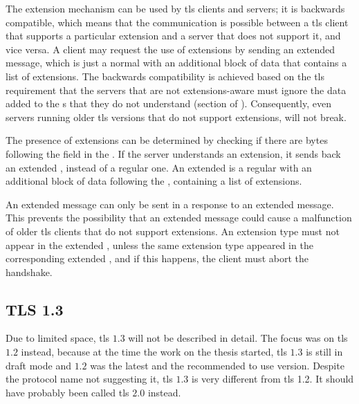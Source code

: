 \documentclass{llncs}
\begin{document}
The extension mechanism can be used by \gls{tls} clients and servers; it is backwards
compatible, which means that the communication is possible between a \gls{tls} client that supports a particular extension and a server that does not support it,
and vice versa. A client may request the use of extensions by sending an extended 
message, which is just a normal  with an additional
block of data that contains a list of extensions. The backwards compatibility is achieved based on the \gls{tls}
requirement that the servers that are not extensions-aware must ignore the data
added to the s that they do not understand (section  of \cite{RFC2246}). Consequently,
even servers running older \gls{tls} versions that do not support extensions, will not break.

The presence of extensions can be determined by checking if there are bytes
following the  field in the .
If the server understands an extension, it sends back an extended ,
instead of a regular one. An extended  is a regular
 with an additional block of data following the
, containing a list of extensions.

An extended  message can only be sent in a response to an
extended  message. This prevents the possibility that an extended
 message could cause a malfunction of older \gls{tls} clients that do not
support extensions. An extension type must not appear in the
extended , unless the same extension type appeared in the
corresponding extended , and if this happens, the client must abort the handshake.

\subsection{TLS 1.3} \label{tls-13}

Due to limited space, \gls{tls} $1.3$\cite{I-D.ietf-tls-tls13} will not be described in detail. 
The focus was on \gls{tls} $1.2$ instead, because at the time the work on the thesis started, 
\gls{tls} $1.3$ is still in draft mode and $1.2$ was the latest and the recommended to use version.
Despite the protocol name not suggesting it, \gls{tls} $1.3$ is
very different from \gls{tls} 1.2. It should have probably been called
\gls{tls} $2.0$ instead.
\end{document}
